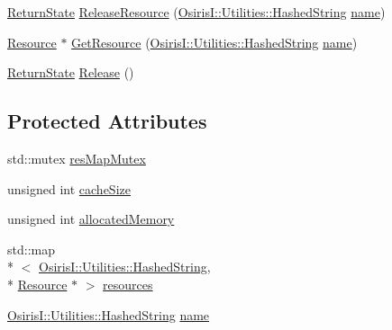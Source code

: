 \begin{DoxyCompactItemize}
\hyperlink{namespace_osiris_i_a8f53bf938dc75c65c6a529694514013e}{Return\-State} \hyperlink{class_osiris_i_1_1_resources_1_1_resource_cache_a9e92546a1d5c1df9895b7d17b47de5cf}{Release\-Resource} (\hyperlink{class_osiris_i_1_1_utilities_1_1_hashed_string}{Osiris\-I\-::\-Utilities\-::\-Hashed\-String} \hyperlink{class_osiris_i_1_1_resources_1_1_resource_cache_a80a0b02592d00bf92b856ee7a9c723a1}{name})
\item 
\hyperlink{class_osiris_i_1_1_resources_1_1_resource}{Resource} $\ast$ \hyperlink{class_osiris_i_1_1_resources_1_1_resource_cache_a3c03343b0cb51ad386da2aa976b22045}{Get\-Resource} (\hyperlink{class_osiris_i_1_1_utilities_1_1_hashed_string}{Osiris\-I\-::\-Utilities\-::\-Hashed\-String} \hyperlink{class_osiris_i_1_1_resources_1_1_resource_cache_a80a0b02592d00bf92b856ee7a9c723a1}{name})
\item 
\hyperlink{namespace_osiris_i_a8f53bf938dc75c65c6a529694514013e}{Return\-State} \hyperlink{class_osiris_i_1_1_resources_1_1_resource_cache_a960b07d8749b1d18c9b86556e815433d}{Release} ()
\end{DoxyCompactItemize}
\subsection*{Protected Attributes}
\begin{DoxyCompactItemize}
\item 
std\-::mutex \hyperlink{class_osiris_i_1_1_resources_1_1_resource_cache_a57c2ffced9afd28d9f541747e53bc9bf}{res\-Map\-Mutex}
\item 
unsigned int \hyperlink{class_osiris_i_1_1_resources_1_1_resource_cache_a678b8c34db6f09a51d4659cfe4fa61ac}{cache\-Size}
\item 
unsigned int \hyperlink{class_osiris_i_1_1_resources_1_1_resource_cache_a631249b2ff45251679e531e1293479e5}{allocated\-Memory}
\item 
std\-::map\\*
$<$ \hyperlink{class_osiris_i_1_1_utilities_1_1_hashed_string}{Osiris\-I\-::\-Utilities\-::\-Hashed\-String}, \\*
\hyperlink{class_osiris_i_1_1_resources_1_1_resource}{Resource} $\ast$ $>$ \hyperlink{class_osiris_i_1_1_resources_1_1_resource_cache_aa1eebb4cc887d87aa5c9089c09b9893f}{resources}
\item 
\hyperlink{class_osiris_i_1_1_utilities_1_1_hashed_string}{Osiris\-I\-::\-Utilities\-::\-Hashed\-String} \hyperlink{class_osiris_i_1_1_resources_1_1_resource_cache_a80a0b02592d00bf92b856ee7a9c723a1}{name}
\end{DoxyCompactItemize}


